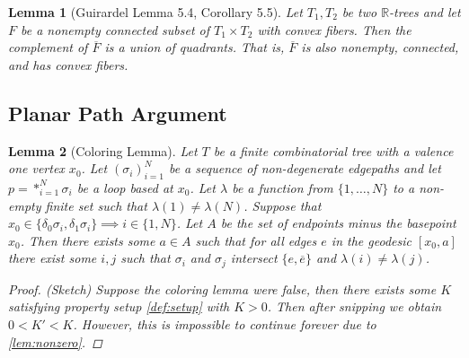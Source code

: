 \documentclass{article}
\theoremstyle{mystyle}
\newtheorem{lem}{Lemma}[section]
\theoremstyle{remark}
\begin{document}
\begin{lem}
	[Guirardel Lemma 5.4, Corollary 5.5]
 \label{lem:guirardel} 
	Let \(T_{1} , T_{2}\) be two \(\mathbb{R}\)-trees and let \(F\) be a nonempty connected subset of \(T_{1} \times T_{2}\) with convex fibers. Then the complement of \(\overline{F}\) is a union of quadrants. That is, \(\overline{F}\) is also nonempty, connected, and has convex fibers.
\end{lem}
\subsection{Planar Path Argument}

 \label{lem:ppa} 
\begin{lem}[Coloring Lemma]
    \label{lem:coloring} 
	Let \(T\) be a finite combinatorial tree with a valence one vertex \(x_{0}\). Let \((\sigma_{i} )_{i=1}^{N}\) be a sequence of non-degenerate edgepaths and let \(p = *_{i=1}^{N} \sigma_{i}\) be a loop based at \(x_{0}\). Let \(\lambda\) be a function from \(\{1,\ldots,N\}\) to a non-empty finite set such that \(\lambda (1) \neq \lambda (N)\). Suppose that \(x_{0} \in \{\delta_{0} \sigma_{i} , \delta_{1} \sigma_{i} \} \implies i \in \{1,N\}\). Let \(A\) be the set of endpoints minus the basepoint \(x_{ 0}\). Then there exists some \(a \in A\) such that for all edges \(e\) in the geodesic \([x_{0} , a]\) there exist some \(i, j\) such that \(\sigma_{i}\) and \(\sigma_{j}\) intersect \(\{e,\overline{e}\}\) and \(\lambda ( i ) \neq \lambda ( j )\).
    \begin{proof}
        (Sketch) Suppose the coloring lemma were false, then there exists some \(K\) satisfying property setup \ref{def:setup} with \(K > 0\). Then after snipping we obtain \(0 < K' < K\). However, this is impossible to continue forever due to \ref{lem:nonzero}.
    \end{proof}
\end{lem}
\end{document}
